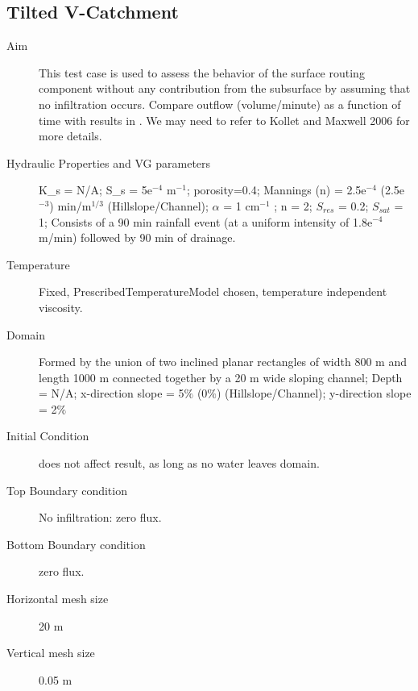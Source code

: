 \documentclass[twoside,10pt]{report}
\begin{document}
\subsection{Tilted V-Catchment}
\begin{description}
\item [Aim] This test case is used to assess the behavior of the surface routing component without any contribution from the subsurface by assuming that no infiltration occurs. Compare outflow (volume/minute) as a function of time with results in \citet{Maxwell14a}. We may need to refer to Kollet and Maxwell 2006 for more details.
\item [Hydraulic Properties and VG parameters] K_s = N/A; S_s = 5e$^{-4}$ m$^{-1}$; porosity=0.4; Mannings (n) = 2.5e$^{-4}$ (2.5e$^{-3}$) min/m$^{1/3}$ (Hillslope/Channel); $\alpha$ = 1 cm$^{-1}$ ; n = 2; $S_{res}$ = 0.2; $S_{sat}$ = 1; Consists
of a 90 min rainfall event (at a
uniform intensity of 1.8e$^{-4}$ m/min) followed by 90 min of drainage.
\item [Temperature] Fixed, PrescribedTemperatureModel chosen, temperature independent viscosity.
\item [Domain] Formed by the union of
two inclined planar rectangles of
width 800 m and length 1000 m connected
together by a 20 m wide sloping
channel; Depth = N/A; x-direction slope = 5$\%$ (0$\%$) (Hillslope/Channel); y-direction slope = 2$\%$
\item [Initial Condition] does not affect result, as long as no water leaves domain.
\item [Top Boundary condition] No infiltration: zero flux.
\item [Bottom Boundary condition] zero flux.
\item [Horizontal mesh size] 20 m
\item [Vertical mesh size] 0.05 m
\end{description}
\end{document}
